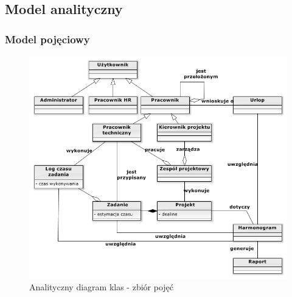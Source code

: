 \subsection{Model analityczny}
\subsubsection{Model pojęciowy}
\begin{figure}[H]
    \centering
    \includegraphics[scale=0.9]{diagramy/modelKlas/Classdiagram2.png}
    \caption{Analityczny diagram klas - zbiór pojęć}
    \label{fig:zbior_pojec}
\end{figure}
